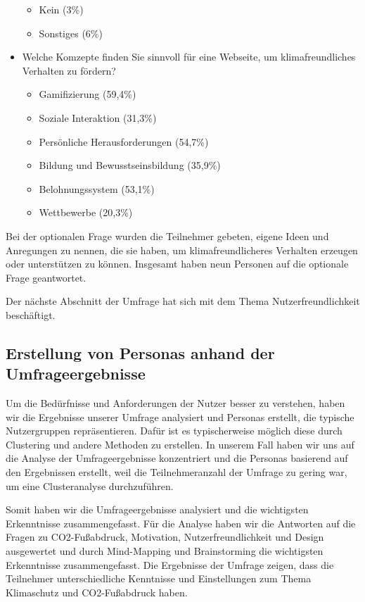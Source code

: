 \begin{itemize}
\begin{itemize}
        \item Kein (3\%)
        \item Sonstiges (6\%)
    \end{itemize}
    \item Welche Komzepte finden Sie sinnvoll für eine Webseite, um klimafreundliches Verhalten zu fördern?
    \begin{itemize}
        \item Gamifizierung (59,4\%)
        \item Soziale Interaktion (31,3\%)
        \item Persönliche Herausforderungen (54,7\%)
        \item Bildung und Bewusstseinsbildung (35,9\%)
        \item Belohnungssystem (53,1\%)
        \item Wettbewerbe (20,3\%)
    \end{itemize}
\end{itemize}

Bei der optionalen Frage wurden die Teilnehmer gebeten, eigene Ideen und Anregungen zu nennen, die sie haben, um klimafreundlicheres Verhalten erzeugen oder unterstützen zu können.
Insgesamt haben neun Personen auf die optionale Frage geantwortet.

Der nächste Abschnitt der Umfrage hat sich mit dem Thema Nutzerfreundlichkeit beschäftigt.
\subsection{Erstellung von Personas anhand der Umfrageergebnisse}

Um die Bedürfnisse und Anforderungen der Nutzer besser zu verstehen, haben wir die Ergebnisse unserer Umfrage analysiert und Personas erstellt, die typische Nutzergruppen repräsentieren. Dafür ist es typischerweise möglich diese durch Clustering und andere Methoden zu erstellen. In unserem Fall haben wir uns auf die Analyse der Umfrageergebnisse konzentriert und die Personas basierend auf den Ergebnissen erstellt, weil die Teilnehmeranzahl der Umfrage zu gering war, um eine Clusteranalyse durchzuführen.

Somit haben wir die Umfrageergebnisse analysiert und die wichtigsten Erkenntnisse zusammengefasst. Für die Analyse haben wir die Antworten auf die Fragen zu CO2-Fußabdruck, Motivation, Nutzerfreundlichkeit und Design ausgewertet und durch Mind-Mapping und Brainstorming die wichtigsten Erkenntnisse zusammengefasst. Die Ergebnisse der Umfrage zeigen, dass die Teilnehmer unterschiedliche Kenntnisse und Einstellungen zum Thema Klimaschutz und CO2-Fußabdruck haben.

